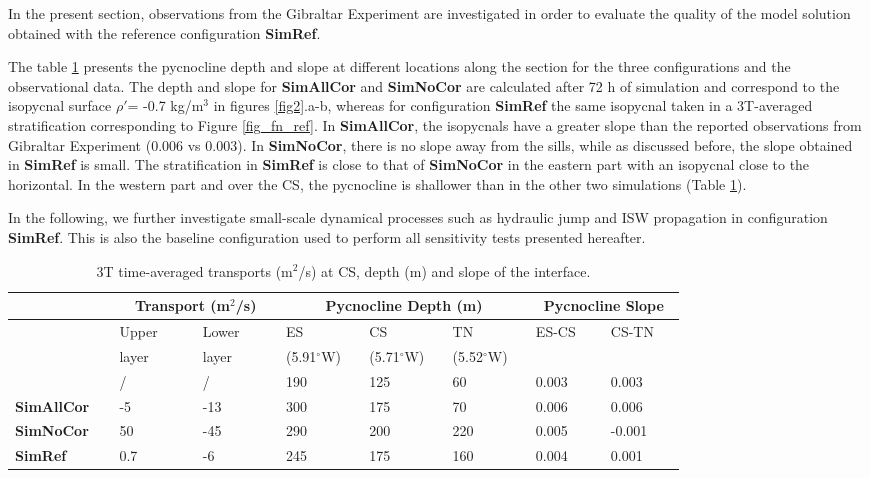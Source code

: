\indent In the present section, observations from the Gibraltar Experiment \citep{FA1988} are investigated in order to evaluate the quality of the model solution obtained with the reference configuration \textbf{SimRef}.

The table \ref{tabdepth} presents the pycnocline depth and slope at different locations along the section for the three configurations and the observational data. The depth and slope for \textbf{SimAllCor} and \textbf{SimNoCor} are calculated after 72 h of simulation and correspond to the isopycnal surface $\rho'$= -0.7 kg/m$^3$ in figures \ref{fig2}.a-b, whereas for configuration \textbf{SimRef} the same isopycnal taken in a 3T-averaged stratification corresponding to Figure \ref{fig_fn_ref}. In \textbf{SimAllCor}, the isopycnals have a greater slope than the reported observations from Gibraltar Experiment (0.006 vs 0.003). In \textbf{SimNoCor}, there is no slope away from the sills, while as discussed before, the slope obtained in \textbf{SimRef} is small. The stratification in \textbf{SimRef} is close to that of \textbf{SimNoCor} in the eastern part with an isopycnal close to the horizontal. In the western part and over the CS, the pycnocline is shallower than in the other two simulations (Table \ref{tabdepth}).

In the following, we further investigate small-scale dynamical processes such as hydraulic jump and ISW propagation in configuration \textbf{SimRef}. This is also the baseline configuration used to perform all sensitivity tests presented hereafter.

\begin{table}[!h]
 \caption{3T time-averaged transports (m$^2$/s) at CS, depth (m) and slope of the interface.}
 \centering
  \begin{tabular}{|p{0.1\linewidth}|p{0.1\linewidth}|p{0.1\linewidth}||p{0.1\linewidth}|p{0.1\linewidth}|p{0.1\linewidth}||p{0.09\linewidth}|p{0.09\linewidth}|}
 \hline
 &\multicolumn{2}{c||}{Transport (m$^2$/s)} & \multicolumn{3}{c||}{Pycnocline Depth (m)} & \multicolumn{2}{c|}{Pycnocline Slope}\\
  \hline
   &Upper  & Lower & ES & CS & TN& ES-CS & CS-TN\\
    &layer &layer &(5.91$^\circ$W)&(5.71$^\circ$W)&(5.52$^\circ$W)& & \\
   \hline
   \citet{FA1988} & / & / & 190  & 125 & 60 & 0.003 & 0.003\\
   \hline
   \textbf{SimAllCor} & -5 & -13 & 300 & 175 & 70 & 0.006 & 0.006\\
   \hline
   \textbf{SimNoCor} & 50 & -45 & 290  & 200 & 220& 0.005 & -0.001\\
   \hline
   \textbf{SimRef} & 0.7& -6 & 245 & 175 & 160 & 0.004 & 0.001\\
  \hline
 \end{tabular}
 \label{tabdepth}
\end{table}

